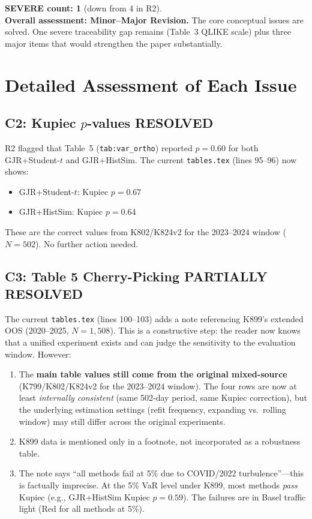\documentclass[12pt,a4paper]{article}
\begin{document}
\medskip

\noindent\textbf{SEVERE count: 1} (down from 4 in R2).\\
\textbf{Overall assessment: Minor--Major Revision.} The core conceptual issues are solved. One severe traceability gap remains (Table~3 QLIKE scale) plus three major items that would strengthen the paper substantially.

\bigskip

\section*{Detailed Assessment of Each Issue}

\subsection*{C2: Kupiec $p$-values \hfill \textcolor{okgreen}{RESOLVED}}

R2 flagged that Table~5 (\texttt{tab:var\_ortho}) reported $p = 0.60$ for both GJR+Student-$t$ and GJR+HistSim. The current \texttt{tables.tex} (lines 95--96) now shows:
\begin{itemize}[nosep]
\item GJR+Student-$t$: Kupiec $p = 0.67$
\item GJR+HistSim: Kupiec $p = 0.64$
\end{itemize}
These are the correct values from K802/K824v2 for the 2023--2024 window ($N = 502$). No further action needed.


\subsection*{C3: Table 5 Cherry-Picking \hfill \textcolor{warncolor}{PARTIALLY RESOLVED}}

The current \texttt{tables.tex} (lines 100--103) adds a note referencing K899's extended OOS (2020--2025, $N = 1{,}508$). This is a constructive step: the reader now knows that a unified experiment exists and can judge the sensitivity to the evaluation window. However:
\begin{enumerate}[nosep]
\item The \textbf{main table values still come from the original mixed-source} (K799/K802/K824v2 for the 2023--2024 window). The four rows are now at least \textit{internally consistent} (same 502-day period, same Kupiec correction), but the underlying estimation settings (refit frequency, expanding vs.\ rolling window) may still differ across the original experiments.
\item K899 data is mentioned only in a footnote, not incorporated as a robustness table.
\item The note says ``all methods fail at 5\% due to COVID/2022 turbulence''---this is factually imprecise. At the 5\% VaR level under K899, most methods \textit{pass} Kupiec (e.g., GJR+HistSim Kupiec $p = 0.59$). The failures are in Basel traffic light (Red for all methods at 5\%).
\end{enumerate}
\end{document}
